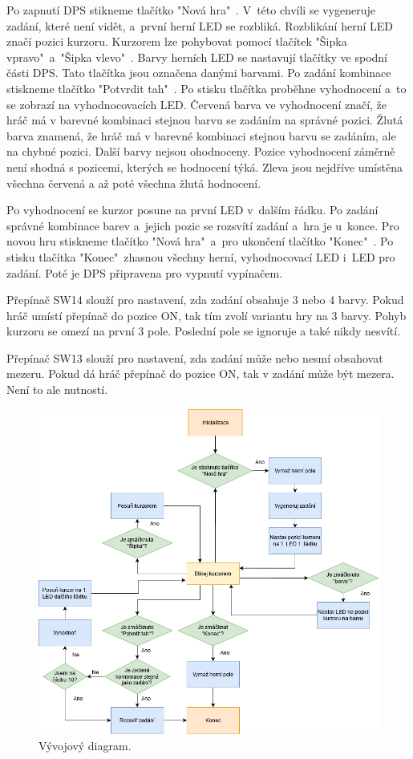Po zapnutí DPS stikneme tlačítko "Nová hra"\ . V~této chvíli se vygeneruje zadání, které není vidět, a~první herní LED se 
rozbliká. Rozblikání herní LED značí pozici kurzoru. 
Kurzorem lze pohybovat pomocí tlačítek "Šipka vpravo"\  a~"Šipka vlevo"\ . Barvy herních LED se nastavují tlačítky ve spodní části 
DPS. Tato tlačítka jsou označena danými barvami.
Po zadání kombinace stiskneme tlačítko "Potvrdit tah"\ . Po stisku tlačítka proběhne vyhodnocení a~to se zobrazí na vyhodnocovacích LED. 
Červená barva ve vyhodnocení značí, že hráč má v barevné kombinaci stejnou barvu se zadáním na správné pozici. Žlutá barva znamená,
že hráč má v barevné kombinaci stejnou barvu se zadáním, ale na chybné pozici. Další barvy nejsou ohodnoceny. Pozice vyhodnocení
záměrně není shodná s pozicemi, kterých se hodnocení týká. Zleva jsou nejdříve umístěna všechna červená a až poté všechna žlutá 
hodnocení.

Po vyhodnocení se kurzor posune na první LED v~dalším řádku.
Po zadání správné kombinace barev a~jejich pozic se rozsvítí zadání a~hra je u~konce. Pro novou hru stiskneme tlačítko
"Nová hra"\  a~pro ukončení tlačítko "Konec"\ .
Po stisku tlačítka "Konec"\  zhasnou všechny herní, vyhodnocovací LED i~LED pro zadání. Poté je DPS připravena pro vypnutí
vypínačem.

Přepínač SW14 slouží pro nastavení, zda zadání obsahuje 3 nebo 4 barvy. Pokud hráč umístí přepínač do pozice ON, tak tím 
zvolí variantu hry na 3 barvy. Pohyb kurzoru se omezí na první 3 pole. Poslední pole se ignoruje a také nikdy nesvítí.

Přepínač SW13 slouží pro nastavení, zda zadání může nebo nesmí obsahovat mezeru. Pokud dá hráč přepínač do pozice ON, 
tak v zadání může být mezera. Není to ale nutností. 

\begin{figure}[!h]
    \begin{center}
        \includegraphics[scale=0.45]{obrazky/vyvojovy_diagram_1_hrac.png}
    \end{center}
    \caption[Vývojový diagram]{Vývojový diagram.}
    \end{figure}


